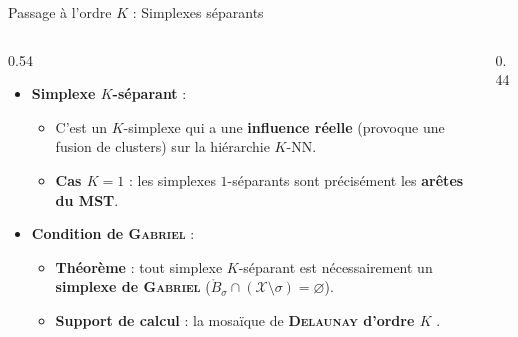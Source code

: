 \documentclass[A4,svgnames,9pt,aspectratio=169]{beamer}
\begin{document}
\begin{frame}{Passage à l'ordre $K$ : Simplexes séparants}
    \begin{columns}[c, onlytextwidth]
        \begin{column}{0.54\textwidth}
            \begin{itemize}
                \setlength{\itemsep}{10pt}
                \item \textbf{Simplexe $K$-séparant} :
                \begin{itemize}
                    \item C'est un $K$-simplexe qui a une \textbf{influence réelle} (provoque une fusion de clusters) sur la hiérarchie $K$-NN.
                    \item \textbf{Cas $K=1$} : les simplexes $1$-séparants sont précisément les \textbf{arêtes du MST}.
                \end{itemize}
                \item \textbf{Condition de \textsc{Gabriel}} :
                \begin{itemize}
                    \item \textbf{Théorème} : tout simplexe $K$-séparant est nécessairement un \textbf{simplexe de \textsc{Gabriel}} ($\mathring{B}_\sigma \cap (\mathcal{X} \setminus \sigma) = \varnothing$).
                    \item \textbf{Support de calcul} : la mosaïque de \textbf{\textsc{Delaunay} d'ordre $K$} \cite{osangEdelsbrunner2023algorithm}.
                \end{itemize}
            \end{itemize}
        \end{column}
        
        \begin{column}{0.44\textwidth}
            \begin{center}
\end{center}
\end{column}
\end{columns}
\end{frame}
\end{document}
